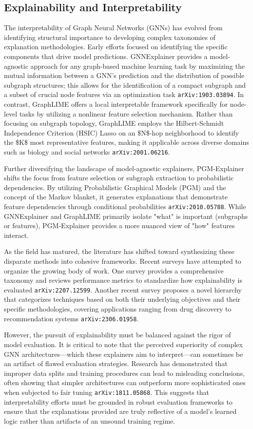 \documentclass[11pt]{article}
\begin{document}
\subsection{Explainability and Interpretability}

The interpretability of Graph Neural Networks (GNNs) has evolved from identifying structural importance to developing complex taxonomies of explanation methodologies. Early efforts focused on identifying the specific components that drive model predictions. GNNExplainer provides a model-agnostic approach for any graph-based machine learning task by maximizing the mutual information between a GNN's prediction and the distribution of possible subgraph structures; this allows for the identification of a compact subgraph and a subset of crucial node features via an optimization task \texttt{arXiv:1903.03894}. In contrast, GraphLIME offers a local interpretable framework specifically for node-level tasks by utilizing a nonlinear feature selection mechanism. Rather than focusing on subgraph topology, GraphLIME employs the Hilbert-Schmidt Independence Criterion (HSIC) Lasso on an \$N\$-hop neighborhood to identify the \$K\$ most representative features, making it applicable across diverse domains such as biology and social networks \texttt{arXiv:2001.06216}.

Further diversifying the landscape of model-agnostic explainers, PGM-Explainer shifts the focus from feature selection or subgraph extraction to probabilistic dependencies. By utilizing Probabilistic Graphical Models (PGM) and the concept of the Markov blanket, it generates explanations that demonstrate feature dependencies through conditional probabilities \texttt{arXiv:2010.05788}. While GNNExplainer and GraphLIME primarily isolate "what" is important (subgraphs or features), PGM-Explainer provides a more nuanced view of "how" features interact.

As the field has matured, the literature has shifted toward synthesizing these disparate methods into cohesive frameworks. Recent surveys have attempted to organize the growing body of work. One survey provides a comprehensive taxonomy and reviews performance metrics to standardize how explainability is evaluated \texttt{arXiv:2207.12599}. Another recent survey proposes a novel hierarchy that categorizes techniques based on both their underlying objectives and their specific methodologies, covering applications ranging from drug discovery to recommendation systems \texttt{arXiv:2306.01958}.

However, the pursuit of explainability must be balanced against the rigor of model evaluation. It is critical to note that the perceived superiority of complex GNN architectures—which these explainers aim to interpret—can sometimes be an artifact of flawed evaluation strategies. Research has demonstrated that improper data splits and training procedures can lead to misleading conclusions, often showing that simpler architectures can outperform more sophisticated ones when subjected to fair tuning \texttt{arXiv:1811.05868}. This suggests that interpretability efforts must be grounded in robust evaluation frameworks to ensure that the explanations provided are truly reflective of a model's learned logic rather than artifacts of an unsound training regime.
\end{document}
